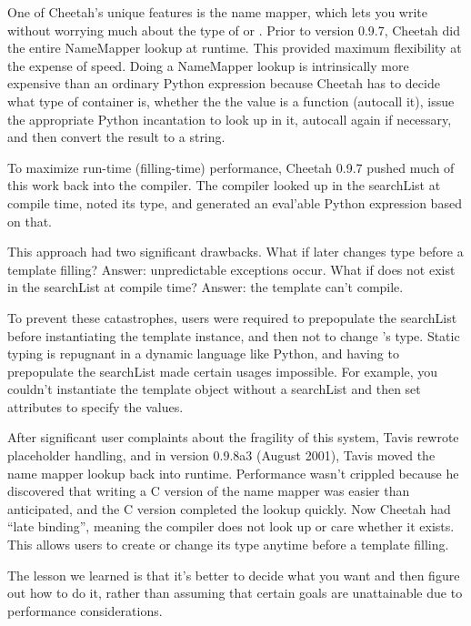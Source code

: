 One of Cheetah's unique features is the name mapper, which lets you write
 without worrying much about the type of  or .
Prior to version 0.9.7, Cheetah did the entire NameMapper lookup at runtime.
This provided maximum flexibility at the expense of speed.  Doing a NameMapper
lookup is intrinsically more expensive than an ordinary Python expression
because Cheetah has to decide what type of container  is, whether the
the value is a function (autocall it), issue the appropriate Python incantation
to look up  in it, autocall again if necessary, and then convert the
result to a string.

To maximize run-time (filling-time) performance, Cheetah 0.9.7 pushed much of
this work back into the compiler.  The compiler looked up  in the
searchList at compile time, noted its type, and generated an eval'able Python
expression based on that.  

This approach had two significant drawbacks.  What if  later changes
type before a template filling?  Answer: unpredictable exceptions occur.  What
if  does not exist in the searchList at compile time?  Answer: the
template can't compile.

To prevent these catastrophes, users were required to prepopulate the
searchList before instantiating the template instance, and then not to change
's type.  Static typing is repugnant in a dynamic language like Python,
and having to prepopulate the searchList made certain usages impossible.  For
example, you couldn't instantiate the template object without a searchList and
then set  attributes to specify the values.  

After significant user complaints about the fragility of this system, Tavis
rewrote placeholder handling, and in version 0.9.8a3 (August 2001), Tavis
moved the name mapper lookup back into runtime.  Performance wasn't crippled
because he discovered that writing a C version of the name mapper was easier
than anticipated, and the C version completed the lookup quickly.  Now Cheetah
had ``late binding'', meaning the compiler does not look up  or care
whether it exists.  This allows users to create  or change its type
anytime before a template filling.

The lesson we learned is that it's better to decide what you want and then
figure out how to do it, rather than assuming that certain goals are 
unattainable due to performance considerations.  



